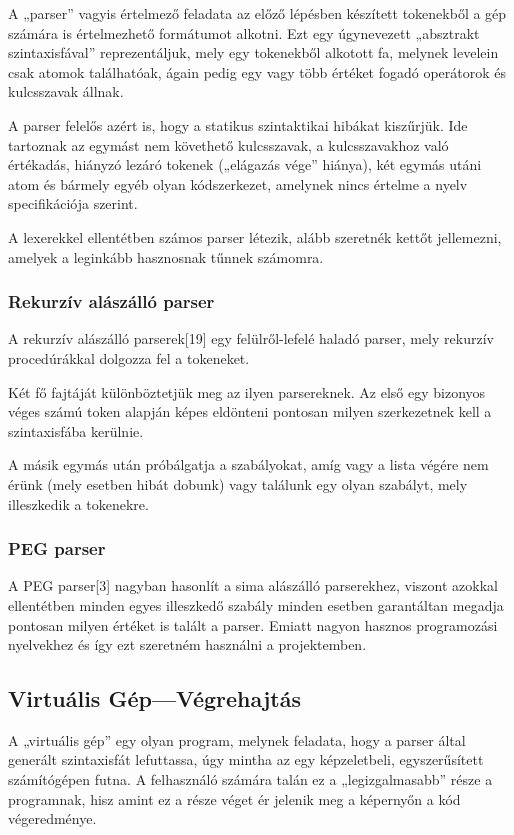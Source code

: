 A „parser” vagyis értelmező feladata az előző lépésben készített tokenekből a gép számára is értelmezhető formátumot alkotni. Ezt egy úgynevezett „absztrakt szintaxisfával” reprezentáljuk, mely egy tokenekből alkotott fa, melynek levelein csak atomok találhatóak, ágain pedig egy vagy több értéket fogadó operátorok és kulcsszavak állnak.

A parser felelős azért is, hogy a statikus szintaktikai hibákat kiszűrjük. Ide tartoznak az egymást nem követhető kulcsszavak, a kulcsszavakhoz való értékadás, hiányzó lezáró tokenek („elágazás vége” hiánya), két egymás utáni atom és bármely egyéb olyan kódszerkezet, amelynek nincs értelme a nyelv specifikációja szerint.

A lexerekkel ellentétben számos parser létezik, alább szeretnék kettőt jellemezni, amelyek a leginkább hasznosnak tűnnek számomra.

\subsubsection{Rekurzív alászálló parser}

A rekurzív alászálló parserek[19] egy felülről-lefelé haladó parser, mely rekurzív procedúrákkal dolgozza fel a tokeneket.

Két fő fajtáját különböztetjük meg az ilyen parsereknek. Az első egy bizonyos véges számú token alapján képes eldönteni pontosan milyen szerkezetnek kell a szintaxisfába kerülnie.

A másik egymás után próbálgatja a szabályokat, amíg vagy a lista végére nem érünk (mely esetben hibát dobunk) vagy találunk egy olyan szabályt, mely illeszkedik a tokenekre.

\subsubsection{PEG parser}

A PEG parser[3] nagyban hasonlít a sima alászálló parserekhez, viszont azokkal ellentétben minden egyes illeszkedő szabály minden esetben garantáltan megadja pontosan milyen értéket is talált a parser. Emiatt nagyon hasznos programozási nyelvekhez és így ezt szeretném használni a projektemben.

\subsection{Virtuális Gép—Végrehajtás}

A „virtuális gép” egy olyan program, melynek feladata, hogy a parser által generált szintaxisfát lefuttassa, úgy mintha az egy képzeletbeli, egyszerűsített számítógépen futna. A felhasználó számára talán ez a „legizgalmasabb” része a programnak, hisz amint ez a része véget ér jelenik meg a képernyőn a kód végeredménye.

